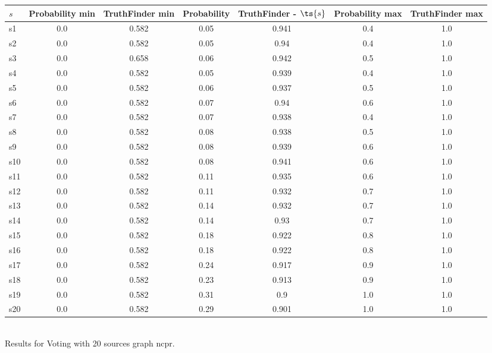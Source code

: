 \documentclass{article}
\begin{document}
\noindent\begin{tabular}{|l|c|c|c|c|c|c|}
\hline
$s$& Probability min & TruthFinder min & Probability & TruthFinder - $\ts{s}$ & Probability max & TruthFinder max\\
\hline
s1 &0.0 & 0.582 & 0.05 & 0.941 & 0.4 & 1.0\\
\hline
s2 &0.0 & 0.582 & 0.05 & 0.94 & 0.4 & 1.0\\
\hline
s3 &0.0 & 0.658 & 0.06 & 0.942 & 0.5 & 1.0\\
\hline
s4 &0.0 & 0.582 & 0.05 & 0.939 & 0.4 & 1.0\\
\hline
s5 &0.0 & 0.582 & 0.06 & 0.937 & 0.5 & 1.0\\
\hline
s6 &0.0 & 0.582 & 0.07 & 0.94 & 0.6 & 1.0\\
\hline
s7 &0.0 & 0.582 & 0.07 & 0.938 & 0.4 & 1.0\\
\hline
s8 &0.0 & 0.582 & 0.08 & 0.938 & 0.5 & 1.0\\
\hline
s9 &0.0 & 0.582 & 0.08 & 0.939 & 0.6 & 1.0\\
\hline
s10 &0.0 & 0.582 & 0.08 & 0.941 & 0.6 & 1.0\\
\hline
s11 &0.0 & 0.582 & 0.11 & 0.935 & 0.6 & 1.0\\
\hline
s12 &0.0 & 0.582 & 0.11 & 0.932 & 0.7 & 1.0\\
\hline
s13 &0.0 & 0.582 & 0.14 & 0.932 & 0.7 & 1.0\\
\hline
s14 &0.0 & 0.582 & 0.14 & 0.93 & 0.7 & 1.0\\
\hline
s15 &0.0 & 0.582 & 0.18 & 0.922 & 0.8 & 1.0\\
\hline
s16 &0.0 & 0.582 & 0.18 & 0.922 & 0.8 & 1.0\\
\hline
s17 &0.0 & 0.582 & 0.24 & 0.917 & 0.9 & 1.0\\
\hline
s18 &0.0 & 0.582 & 0.23 & 0.913 & 0.9 & 1.0\\
\hline
s19 &0.0 & 0.582 & 0.31 & 0.9 & 1.0 & 1.0\\
\hline
s20 &0.0 & 0.582 & 0.29 & 0.901 & 1.0 & 1.0\\
\hline
\end{tabular}\\

\noindent Results for Voting with 20 sources graph ncpr.
\end{document}
